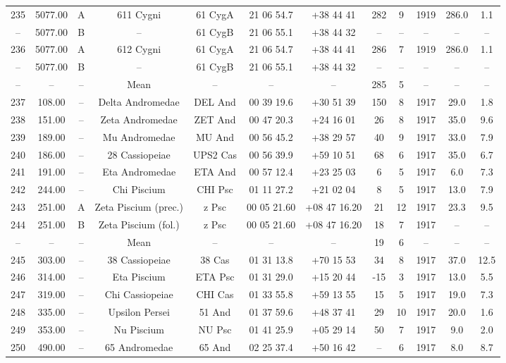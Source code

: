 \begin{table}
\begin{tabular}{cccccccccccc}
235 & 5077.00 & A & 611 Cygni & 61 CygA & 21 06 54.7 & +38 44 41 & 282 & 9 & 1919 & 286.0 & 1.1 \\
-- & 5077.00 & B & -- & 61 CygB & 21 06 55.1 & +38 44 32 & -- & -- & -- & -- & -- \\
236 & 5077.00 & A & 612 Cygni & 61 CygA & 21 06 54.7 & +38 44 41 & 286 & 7 & 1919 & 286.0 & 1.1 \\
-- & 5077.00 & B & -- & 61 CygB & 21 06 55.1 & +38 44 32 & -- & -- & -- & -- & -- \\
-- & -- & -- & Mean & -- & -- & -- & 285 & 5 & -- & -- & -- \\
237 & 108.00 & -- & Delta Andromedae & DEL And & 00 39 19.6 & +30 51 39 & 150 & 8 & 1917 & 29.0 & 1.8 \\
238 & 151.00 & -- & Zeta Andromedae & ZET And & 00 47 20.3 & +24 16 01 & 26 & 8 & 1917 & 35.0 & 9.6 \\
239 & 189.00 & -- & Mu Andromedae & MU And & 00 56 45.2 & +38 29 57 & 40 & 9 & 1917 & 33.0 & 7.9 \\
240 & 186.00 & -- & 28 Cassiopeiae & UPS2 Cas & 00 56 39.9 & +59 10 51 & 68 & 6 & 1917 & 35.0 & 6.7 \\
241 & 191.00 & -- & Eta Andromedae & ETA And & 00 57 12.4 & +23 25 03 & 6 & 5 & 1917 & 6.0 & 7.3 \\
242 & 244.00 & -- & Chi Piscium & CHI Psc & 01 11 27.2 & +21 02 04 & 8 & 5 & 1917 & 13.0 & 7.9 \\
243 & 251.00 & A & Zeta Piscium (prec.) & z Psc & 00 05 21.60 & +08 47 16.20 & 21 & 12 & 1917 & 23.3 & 9.5 \\
244 & 251.00 & B & Zeta Piscium (fol.) & z Psc & 00 05 21.60 & +08 47 16.20 & 18 & 7 & 1917 & -- & -- \\
-- & -- & -- & Mean & -- & -- & -- & 19 & 6 & -- & -- & -- \\
245 & 303.00 & -- & 38 Cassiopeiae & 38 Cas & 01 31 13.8 & +70 15 53 & 34 & 8 & 1917 & 37.0 & 12.5 \\
246 & 314.00 & -- & Eta Piscium & ETA Psc & 01 31 29.0 & +15 20 44 & -15 & 3 & 1917 & 13.0 & 5.5 \\
247 & 319.00 & -- & Chi Cassiopeiae & CHI Cas & 01 33 55.8 & +59 13 55 & 15 & 5 & 1917 & 19.0 & 7.3 \\
248 & 335.00 & -- & Upsilon Persei & 51 And & 01 37 59.6 & +48 37 41 & 29 & 10 & 1917 & 20.0 & 1.6 \\
249 & 353.00 & -- & Nu Piscium & NU Psc & 01 41 25.9 & +05 29 14 & 50 & 7 & 1917 & 9.0 & 2.0 \\
250 & 490.00 & -- & 65 Andromedae & 65 And & 02 25 37.4 & +50 16 42 & -- & 6 & 1917 & 8.0 & 8.7 \\

\end{tabular}
\end{table}
